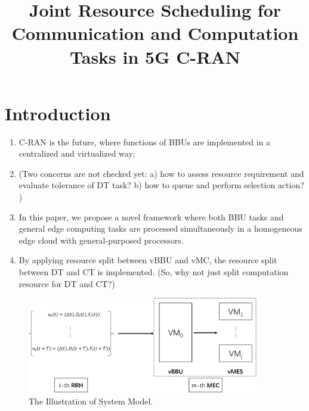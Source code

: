 \documentclass[journal, 12pt, onecolumn, draftclsnofoot]{IEEEtran}
\newcommand{\fixit}[1]{{\leavevmode\color{red}(#1)}}
\newcommand{\deny}[1]{}
\begin{document}
	
	\title{
		Joint Resource Scheduling for \deny{Heterogeneous} Communication and Computation Tasks in 5G C-RAN
	}
	\author{
    }%
	\maketitle

\section{Introduction}
\begin{enumerate}
	\item C-RAN is the future, where functions of BBUs are implemented in a centralized and virtualized way;
	\item \fixit{Two concerns are not checked yet: a) how to assess resource requirement and evaluate tolerance of DT task? b) how to queue and perform selection action? }
	\item In this paper, we propose a novel framework where both BBU tasks and general edge computing tasks are processed simultaneously in a homogeneous edge cloud with general-purposed processors.
	\item By applying resource split between vBBU and vMC, the resource split between DT and CT is implemented. \fixit{So, why not just split computation resource for DT and CT?} 
\end{enumerate}

\begin{figure}[htb!]
	\centering
	\includegraphics[width=0.9\textwidth]{images/cran-system-model.pdf}
	\caption{The Illustration of System Model.}
	\label{fig:scenario}
\end{figure}
\end{document}
